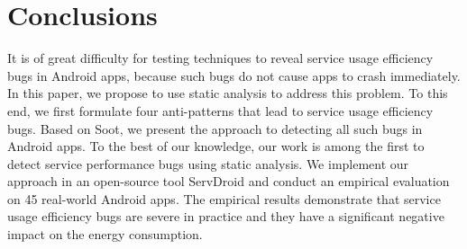 \documentclass[conference]{IEEEtran}
\begin{document}
\section{Conclusions}\label{conclusion}
It is of great difficulty for testing techniques to reveal service usage efficiency bugs in Android apps, because such bugs do not cause apps to crash immediately. In this paper, we propose to use static analysis to address this problem. To this end, we first formulate four anti-patterns that lead to service usage efficiency bugs. Based on {\sf Soot}, we present the approach to detecting all such bugs in Android apps. To the best of our knowledge, our work is among the first to detect service performance bugs using static analysis. We implement our approach in an open-source tool {\sf ServDroid} and conduct an empirical evaluation on 45 real-world Android apps. The empirical results demonstrate that service usage efficiency bugs are severe in practice and they have a significant negative impact on the energy consumption.






\end{document}

